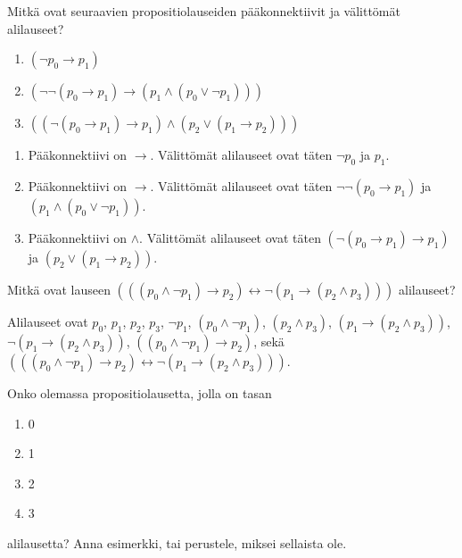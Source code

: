 \documentclass[12pt,a4paper]{article}
\begin{document}
\begin{exercise}
Mitkä ovat seuraavien propositiolauseiden pääkonnektiivit ja välittömät
alilauseet?
\begin{enumerate}[label=\alph*), nosep]
\item \((\neg p_0 \rightarrow p_1)\)
\item \((\neg \neg (p_0 \rightarrow p_1) \rightarrow (p_1 \land (p_0
\lor \neg p_1)))\)
\item \(((\neg(p_0 \rightarrow p_1) \rightarrow p_1) \land (p_2 \lor
(p_1 \rightarrow p_2)))\)
\end{enumerate}
\end{exercise}

\begin{solution}
\leavevmode\par
\begin{enumerate}[label=\alph*), nosep]
\item Pääkonnektiivi on \(\rightarrow\). Välittömät alilauseet ovat täten
\(\neg p_0\) ja \(p_1\).
\item Pääkonnektiivi on \(\rightarrow\). Välittömät alilauseet ovat täten
\(\neg \neg(p_0 \rightarrow p_1)\) ja \((p_1 \land (p_0 \lor \neg p_1))\).
\item Pääkonnektiivi on \(\land\). Välittömät alilauseet ovat täten
\((\neg(p_0 \rightarrow p_1) \rightarrow p_1)\) ja
\((p_2 \lor (p_1 \rightarrow p_2))\).
\end{enumerate}
\end{solution}

\begin{exercise}
Mitkä ovat lauseen
\((((p_0 \land \neg p_1) \rightarrow p_2) \leftrightarrow \neg(p_1
\rightarrow (p_2 \land p_3)))\)
alilauseet?
\end{exercise}

\begin{solution}
Alilauseet ovat \(p_0\), \(p_1\), \(p_2\), \(p_3\), \(\neg p_1\),
\((p_0 \land \neg p_1)\), \((p_2 \land p_3)\), \((p_1 \rightarrow
(p_2 \land p_3))\), \(\neg(p_1 \rightarrow (p_2 \land p_3))\),
\(((p_0 \land \neg p_1) \rightarrow p_2)\),
sekä \((((p_0 \land \neg p_1) \rightarrow p_2) \leftrightarrow \neg(p_1
\rightarrow (p_2 \land p_3)))\).
\end{solution}

\begin{exercise}
Onko olemassa propositiolausetta, jolla on tasan
\begin{enumerate}[label=\alph*), nosep]
\item 0
\item 1
\item 2
\item 3
\end{enumerate}
alilausetta? Anna esimerkki, tai perustele, miksei sellaista ole.
\end{exercise}
\end{document}

